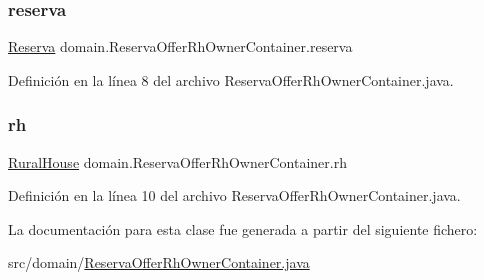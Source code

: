 \subsubsection{\texorpdfstring{reserva}{reserva}}
{\footnotesize\ttfamily \mbox{\hyperlink{classdomain_1_1_reserva}{Reserva}} domain.\+Reserva\+Offer\+Rh\+Owner\+Container.\+reserva\hspace{0.3cm}{\ttfamily [private]}}



Definición en la línea 8 del archivo Reserva\+Offer\+Rh\+Owner\+Container.\+java.

\mbox{\label{classdomain_1_1_reserva_offer_rh_owner_container_a96ee8f1952c3b10e5ca8cbf71fdf95cf}} 
\subsubsection{\texorpdfstring{rh}{rh}}
{\footnotesize\ttfamily \mbox{\hyperlink{classdomain_1_1_rural_house}{Rural\+House}} domain.\+Reserva\+Offer\+Rh\+Owner\+Container.\+rh\hspace{0.3cm}{\ttfamily [private]}}



Definición en la línea 10 del archivo Reserva\+Offer\+Rh\+Owner\+Container.\+java.



La documentación para esta clase fue generada a partir del siguiente fichero\+:\begin{DoxyCompactItemize}
\item 
src/domain/\mbox{\hyperlink{_reserva_offer_rh_owner_container_8java}{Reserva\+Offer\+Rh\+Owner\+Container.\+java}}\end{DoxyCompactItemize}
